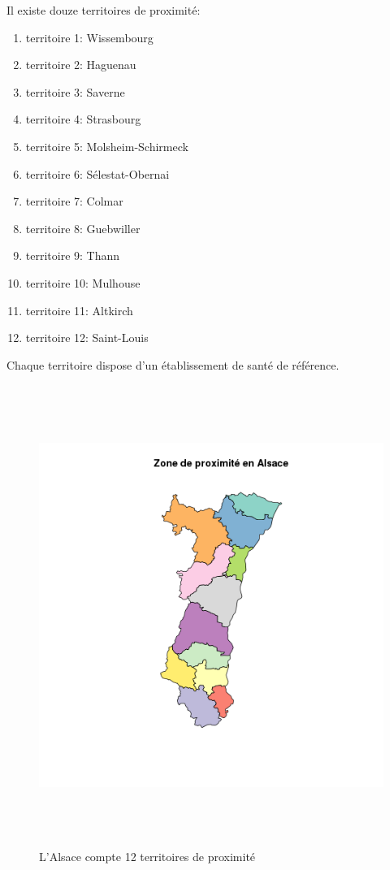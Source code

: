 \documentclass[12pt,english,french,twoside]{report}\usepackage[]{graphicx}\usepackage[]{color}
\begin{document}
Il existe douze territoires de proximité:
\begin{enumerate}
  \item territoire 1: Wissembourg
  \item territoire 2: Haguenau
  \item territoire 3: Saverne
  \item territoire 4: Strasbourg
  \item territoire 5: Molsheim-Schirmeck
  \item territoire 6: Sélestat-Obernai
  \item territoire 7: Colmar
  \item territoire 8: Guebwiller
  \item territoire 9: Thann
  \item territoire 10: Mulhouse
  \item territoire 11: Altkirch
  \item territoire 12: Saint-Louis
\end{enumerate}

Chaque territoire dispose d'un établissement de santé de référence.

\begin{figure}[ht]
 \centering
 \includegraphics[height=15cm,keepaspectratio=true]{../doc/cartographie/RPU2013_Carto_Pop/figure/zone_proximite.png}
 \caption{L'Alsace compte 12 territoires de proximité}
 \label{fig:zp}
\end{figure}
\end{document}
